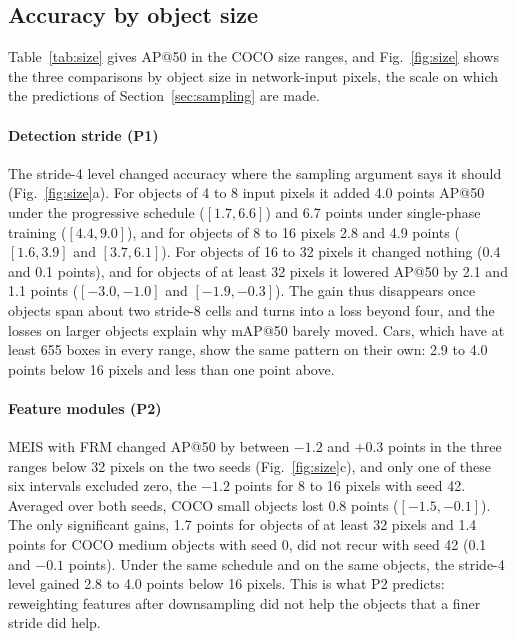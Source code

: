 \documentclass[preprint,12pt]{elsarticle}
\begin{document}
\subsection{Accuracy by object size}
\label{sec:res-size}

Table~\ref{tab:size} gives AP@50 in the COCO size ranges, and
Fig.~\ref{fig:size} shows the three comparisons by object size in network-input
pixels, the scale on which the predictions of Section~\ref{sec:sampling} are made.

\paragraph{Detection stride (P1)}
The stride-4 level changed accuracy where the sampling argument says it should
(Fig.~\ref{fig:size}a). For objects of 4 to 8 input pixels it added 4.0 points
AP@50 under the progressive schedule ($[1.7, 6.6]$) and 6.7 points under
single-phase training ($[4.4, 9.0]$), and for objects of 8 to 16 pixels 2.8 and
4.9 points ($[1.6, 3.9]$ and $[3.7, 6.1]$). For objects of 16 to 32 pixels it
changed nothing (0.4 and 0.1 points), and for objects of at least 32 pixels it
lowered AP@50 by 2.1 and 1.1 points ($[-3.0, -1.0]$ and $[-1.9, -0.3]$). The gain
thus disappears once objects span about two stride-8 cells and turns into a loss
beyond four, and the losses on larger objects explain why mAP@50 barely moved. Cars, which have at least 655
boxes in every range, show the same pattern on their own: 2.9 to 4.0 points below
16 pixels and less than one point above.

\paragraph{Feature modules (P2)}
MEIS with FRM changed AP@50 by between $-1.2$ and $+0.3$ points in the three
ranges below 32 pixels on the two seeds (Fig.~\ref{fig:size}c), and only one of
these six intervals excluded zero, the $-1.2$ points for 8 to 16 pixels with seed
42. Averaged over both seeds, COCO small objects lost 0.8 points ($[-1.5, -0.1]$).
The only significant gains, 1.7 points for objects of at least 32 pixels and 1.4
points for COCO medium objects with seed 0, did not recur with seed 42 (0.1 and
$-0.1$ points). Under the same schedule and on the
same objects, the stride-4 level gained 2.8 to 4.0 points below 16 pixels. This is
what P2 predicts: reweighting features after downsampling did not help the objects
that a finer stride did help.
\end{document}
